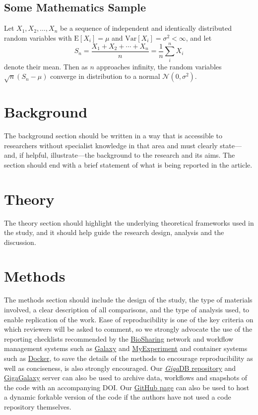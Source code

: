 \documentclass[a4paper,alpha-refs]{aejstyles}
\begin{document}
\subsection{Some Mathematics Sample}

Let $X_1, X_2, \ldots, X_n$ be a sequence of independent and identically distributed random variables with $\text{E}[X_i] = \mu$ and $\text{Var}[X_i] = \sigma^2 < \infty$, and let
%
\begin{equation}
S_n = \frac{X_1 + X_2 + \cdots + X_n}{n}
      = \frac{1}{n}\sum_{i}^{n} X_i
\end{equation}
%
denote their mean. Then as $n$ approaches infinity, the random variables $\sqrt{n}(S_n - \mu)$ converge in distribution to a normal $\mathcal{N}(0, \sigma^2)$.


\section{Background}
\label{sec:background}

The background section should be written in a way that is accessible to researchers without specialist knowledge in that area and must clearly state---and, if helpful, illustrate---the background to the research and its aims. The section should end with a brief statement of what is being reported in the article.

\section{Theory}

The theory section should highlight the underlying theoretical frameworks used in the study, and it should help guide the research design, analysis and the discussion.

\section{Methods}

The methods section should include the design of the study, the type of materials involved, a clear description of all comparisons, and the type of analysis used, to enable replication of the work. Ease of reproducibility is one of the key criteria on which reviewers will be asked to comment, so we strongly advocate the use of the reporting checklists recommended by the \href{https://biosharing.org/}{BioSharing} network and workflow management systems such as \href{https:/galaxyproject.org/}{Galaxy} and \href{http://www.myexperiment.org/home}{MyExperiment} and container systems such as \href{https://www.docker.com/}{Docker}, to save the details of the methods to encourage reproducibility as well as conciseness, is also strongly encouraged. Our \href{http://gigadb.org/}{\textit{Giga}DB repository}{} and \href{http://galaxy.cbiit.cuhk.edu.hk/}{GigaGalaxy} server can also be used to archive data, workflows and snapshots of the code with an accompanying DOI. Our \href{https://github.com/Astronomy Education Journal/papers}{GitHub page} can also be used to host a dynamic forkable version of the code if the authors have not used a code repository themselves.
\end{document}

